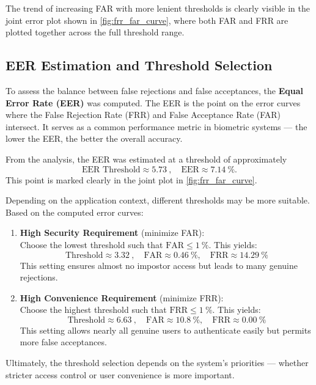 \documentclass[a4paper,12pt]{article}
\begin{document}
\vspace{0.5em}
\noindent
The trend of increasing FAR with more lenient thresholds is clearly visible in the joint error plot shown in \autoref{fig:frr_far_curve}, where both FAR and FRR are plotted together across the full threshold range.

\subsection{EER Estimation and Threshold Selection}

\noindent
To assess the balance between false rejections and false acceptances, the \textbf{Equal Error Rate (EER)} was computed. The EER is the point on the error curves where the False Rejection Rate (FRR) and False Acceptance Rate (FAR) intersect. It serves as a common performance metric in biometric systems — the lower the EER, the better the overall accuracy.

\vspace{0.5em}
\noindent
From the analysis, the EER was estimated at a threshold of approximately
\[
\text{EER Threshold} \approx \SI{5.73}{}, \quad \text{EER} \approx \SI{7.14}{\percent}.
\]
This point is marked clearly in the joint plot in \autoref{fig:frr_far_curve}.

\vspace{1em}
\noindent
Depending on the application context, different thresholds may be more suitable. Based on the computed error curves:

\begin{enumerate}[label=\textbf{\arabic*)}, itemsep=0.6em]
    \item \textbf{High Security Requirement} (minimize FAR):\\
    Choose the lowest threshold such that \(\text{FAR} \leq \SI{1}{\percent}\). This yields:
    \[
    \text{Threshold} \approx \SI{3.32}{}, \quad \text{FAR} \approx \SI{0.46}{\percent}, \quad \text{FRR} \approx \SI{14.29}{\percent}
    \]
    This setting ensures almost no impostor access but leads to many genuine rejections.

    \item \textbf{High Convenience Requirement} (minimize FRR):\\
    Choose the highest threshold such that \(\text{FRR} \leq \SI{1}{\percent}\). This yields:
    \[
    \text{Threshold} \approx \SI{6.63}{}, \quad \text{FAR} \approx \SI{10.8}{\percent}, \quad \text{FRR} \approx \SI{0.00}{\percent}
    \]
    This setting allows nearly all genuine users to authenticate easily but permits more false acceptances.
\end{enumerate}

\vspace{0.5em}
\noindent
Ultimately, the threshold selection depends on the system’s priorities — whether stricter access control or user convenience is more important.

\newpage
\printbibliography
\end{document}
